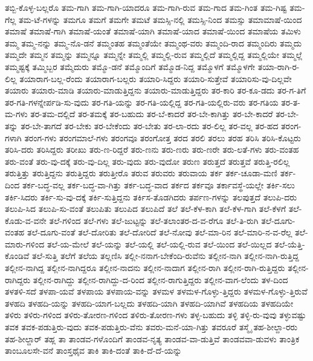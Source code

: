 {ತಬ್ಬಿ-ಕೊಳ್ಳ-ಬಲ್ಲರೊ
ತಮ-ಗಾಗಿ
ತಮ-ಗಾಗಿ-ಯಾದರೂ
ತಮ-ಗಾಗಿ-ರುವ
ತಮ-ಗಾದ
ತಮ-ಗಿಂತ
ತಮ-ಗಿಷ್ಟ
ತಮ-ಗೆಲ್ಲ
ತಮ-ಟೆ-ಗಳನ್ನು
ತಮಗೂ
ತಮಗೆ
ತಮಗೇ
ತಮಟೆ
ತಮಸ್ಸಿ-ನಲ್ಲಿ
ತಮಸ್ಸಿ-ನಿಂದ
ತಮಸ್ಸು
ತಮಾಮಾಷೆ-ಯಿಂದ
ತಮಾಷೆ
ತಮಾಷೆ-ಗಾಗಿ
ತಮಾಷೆ-ಯಂತೆ
ತಮಾಷೆ-ಯಾಗಿ
ತಮಾಷೆ-ಯಾದ
ತಮಾಷೆ-ಯಿಂದ
ತಮಾಷೆಯ
ತಮಿಳು
ತಮ್ಮ
ತಮ್ಮ-ನನ್ನು
ತಮ್ಮ-ನೊ-ಡನೆ
ತಮ್ಮಂತಹ
ತಮ್ಮಂತೆಯೇ
ತಮ್ಮಂಥ-ವರು
ತಮ್ಮಂದಿ-ರಾದ
ತಮ್ಮಂದಿರು
ತಮ್ಮದು
ತಮ್ಮದೇ
ತಮ್ಮನ
ತಮ್ಮನ್ನು
ತಮ್ಮನ್ನೂ
ತಮ್ಮನ್ನೇ
ತಮ್ಮಲ್ಲಿ
ತಮ್ಮಲ್ಲಿ-ರುವ
ತಮ್ಮಲ್ಲಿದೆ
ತಮ್ಮಲ್ಲಿದ್ದ
ತಮ್ಮಲ್ಲಿಯೇ
ತಮ್ಮಲ್ಲೆ
ತಮ್ಮಷ್ಟಕ್ಕೆ
ತಮ್ಮಿಬ್ಬರ
ತಮ್ಮೆದುರು
ತಮ್ಮೊ-ಡನೆ
ತಮ್ಮೊಂದಿಗೆ
ತಮ್ಮೊಡ-ನಿದ್ದ
ತಮ್ಮೊಳಗೆ
ತಮ್ಮೊಳಗೇ
ತಯಾ-ರಾಗಿ-ರ-ಲಿಲ್ಲ
ತಯಾರಾಗ-ಬಲ್ಲ-ರೆಂದು
ತಯಾರಾಗ-ಬಲ್ಲರು
ತಯಾರಿ-ಸಿದ್ದರು
ತಯಾರಿ-ಸುತ್ತೇವೆ
ತಯಾರಿಸು-ವು-ದಿಲ್ಲವೇ
ತಯಾರು
ತಯಾರು-ಮಾಡಿ
ತಯಾರು-ಮಾಡುತ್ತಿದ್ದನು
ತಯಾರು-ಮಾಡುತ್ತಿದ್ದರು
ತರ-ಕಾರಿ
ತರ-ಕೂ-ಡದು
ತರ-ಗ-ತಿಗೆ
ತರ-ಗತಿ-ಗಳನ್ನೇರ್ಪಡಿ-ಸು-ವುದು
ತರ-ಗತಿ-ಯನ್ನು
ತರ-ಗತಿ-ಯಲ್ಲಿದ್ದ
ತರ-ಗತಿ-ಯಲ್ಲಿರು-ವರು
ತರ-ಗತಿಯ
ತರ-ತ-ಮ-ಗಳು
ತರ-ತಮ-ದಲ್ಲಿದೆ
ತರ-ತಮಕ್ಕೆ
ತರ-ಬಹುದು
ತರ-ಬೆ-ಕಾದರೆ
ತರ-ಬೇ-ಕಾಗಿತ್ತು
ತರ-ಬೇ-ಕಾದರೆ
ತರ-ಬೇ-ತನ್ನು
ತರ-ಬೇ-ತಾಗದೆ
ತರ-ಬೇಕು
ತರ-ಬೇಕೆಂದು
ತರ-ಬೇತು
ತರ-ಲಾ-ರದು
ತರ-ಲಿಲ್ಲ
ತರ-ವಲ್ಲ
ತರ-ಹದ
ತರಂಗ-ಗಳಾಗಿ
ತರಂಗ-ಗಳು
ತರಂಗಮಾಲೆ-ಗಳು
ತರಂಗವೂ
ತರಂಗೋತ್ತ
ತರದ
ತರಲಿ
ತರಲು
ತರಹ
ತರಿಸಿ
ತರಿಸಿ-ಕೊಟ್ಟರು
ತರಿಸಿ-ದರು
ತರಿಸಿದ್ದರು
ತರೀಖು
ತರು-ಣ-ರಿದ್ದರೆ
ತರು-ಣನು
ತರು-ಣರು
ತರು-ಣರೇ
ತರು-ಲತೆ-ಗಳು
ತರು-ವಂತಹ
ತರು-ವಂತೆ
ತರು-ವು-ದಕ್ಕೆ
ತರು-ವು-ದಿಲ್ಲ
ತರು-ವುದು
ತರು-ವುದೋ
ತರುಣ
ತರುತ್ತದೆ
ತರುತ್ತವೆ
ತರುತ್ತಿ-ರಲಿಲ್ಲ
ತರುತ್ತಿತ್ತು
ತರುತ್ತಿದ್ದನು
ತರುತ್ತಿದ್ದರು
ತರುತ್ತೀರೊ
ತರುವ
ತರುವರು
ತರುವಾಯ
ತರ್ಕ
ತರ್ಕ-ಚೂಡಾ-ಮಣಿ
ತರ್ಕ-ದಿಂದ
ತರ್ಕ-ಬದ್ಧ-ವಲ್ಲ
ತರ್ಕ-ಬದ್ಧ-ವಾ-ಗಿತ್ತು
ತರ್ಕ-ಬದ್ಧ-ವಾದ
ತರ್ಕದ
ತರ್ಕವೂ
ತರ್ಕಾವಸ್ಥೆ-ಯಲ್ಲೇ
ತರ್ಕಿ-ಸಲು
ತರ್ಕಿ-ಸಿದರು
ತರ್ಕಿ-ಸು-ವು-ದಕ್ಕೆ
ತರ್ಕಿ-ಸುತ್ತಿದ್ದನು
ತರ್ಕಿಸ-ತೊಡಗಿದರು
ತರ್ಪಣ-ಗಳನ್ನು
ತಲಪುತ್ತದೆ
ತಲುಪಿ-ದರು
ತಲುಪಿ-ಸಿದ
ತಲುಪಿ-ಸು-ವಂತೆ
ತಲುಪಿತು
ತಲುಪಿದ
ತಲುಪಿದೆ
ತಲೆ
ತಲೆ-ಕೆಳ-ಕಾಗಿ
ತಲೆ-ಕೆಳ-ಗಾಗಿ
ತಲೆ-ಕೆಳಗೆ
ತಲೆ-ಕೊಡು-ವ-ವನೇ
ತಲೆ-ಗಳಿಂದ
ತಲೆ-ಗಳು
ತಲೆ-ಜುಟ್ಟನ್ನು
ತಲೆ-ತಲಾಂತರ-ದ-ವ-ರೆಗೂ
ತಲೆ-ತಿ-ರುಗಿ
ತಲೆ-ದೂಗು-ವಂತಹ
ತಲೆ-ದೂಗು-ವಂತೆ
ತಲೆ-ದೋರಿತು
ತಲೆ-ದೋರಿದೆ
ತಲೆ-ನೋವು
ತಲೆ-ಮಾ-ರಿನ
ತಲೆ-ಮಾರಿ-ನ-ವ-ರೆಲ್ಲ
ತಲೆ-ಮಾರು-ಗಳಿಂದ
ತಲೆ-ಯ-ಮೇಲೆ
ತಲೆ-ಯನ್ನು
ತಲೆ-ಯಲ್ಲಿ
ತಲೆ-ಯಲ್ಲಿ-ರುವ
ತಲೆ-ಯಿಂದ
ತಲೆ-ಯಿಲ್ಲದ
ತಲೆ-ಯೆತ್ತಿ-ಕೊಂಡಿವೆ
ತಲೆ-ಸುತ್ತಿ
ತಲೆಗೆ
ತಲೆಯ
ತಲ್ಲಣಿಸಿ
ತಲ್ಲೀ-ನನಾಗ-ಬೇಕೆಂದಿ-ರುವೆನು
ತಲ್ಲೀನ-ನಾಗಿ
ತಲ್ಲೀನ-ನಾಗಿ-ರುತ್ತಿದ್ದ
ತಲ್ಲೀನ-ನಾಗಿದ್ದ
ತಲ್ಲೀನ-ನಾಗಿದ್ದರೂ
ತಲ್ಲೀನ-ನಾದನು
ತಲ್ಲೀನ-ನಾದಾಗ
ತಲ್ಲೀನ-ರಾಗಿ
ತಲ್ಲೀನ-ರಾಗಿ-ರುತ್ತಿದ್ದರು
ತಲ್ಲೀನ-ರಾಗಿದ್ದರು
ತಲ್ಲೀನ-ರಾಗಿದ್ದು
ತಲ್ಲೀನ-ರಾಗಿದ್ದು-ದ-ರಿಂದ
ತಲ್ಲೀನ-ರಾಗುತ್ತಿದ್ದರು
ತಲ್ಲೀನ-ವಾಗ-ಲೆಂದು
ತಳ-ದಿಂದ
ತಳತಳಿ-ಸದೆ
ತಳಪಾ-ಯವೆ
ತಳಪಾಯ
ತಳಪಾಯ-ವನ್ನು
ತಳಮಳ
ತಳಮಳ-ಗೊಳ್ಳು-ತ್ತಿದ್ದರು
ತಳಮಳ-ಗೊಳ್ಳು-ತ್ತಿರುವೆ
ತಳಹದಿ
ತಳಹದಿ-ಯನ್ನು
ತಳಹದಿ-ಯಾಗ-ಬಲ್ಲದು
ತಳಹದಿ-ಯಾಗಿ
ತಳಹದಿ-ಯಾಗಿವೆ
ತಳಹದಿಯ
ತಳಹದಿಯೇ
ತಳಿರು
ತಳಿರು-ಗಳಿಂದ
ತಳಿರು-ತೋರಣ-ಗಳಿಂದ
ತಳಿರು-ತೋರಣ-ಗಳು
ತಳ್ಳ-ಬಹುದು
ತಳ್ಳಿ
ತಳ್ಳಿ-ರು-ವುವು
ತಳ್ಳುವಷ್ಟು
ತವಕ
ತವಕ-ಪಡುತ್ತಿರು-ವುದು
ತವಕ-ಪಡುತ್ತಿರು-ವೆನು
ತವರು-ಮನೆ-ಯಾ-ಗಿತ್ತು
ತವರೂರೆ
ತಸ್ಮೈ
ತಹ-ಶೀಲ್ದಾ-ರರು
ತಹ-ಶೀಲ್ದಾರ್
ತಹ್ಲ
ತಾ
ತಾಂಡವ-ಗಳೊಂದಿಗೆ
ತಾಂಡವ-ನೃತ್ಯ
ತಾಂಡವ-ವಾ-ಡುತ್ತಿವೆ
ತಾಂಡವವಾ-ಡುವಳು
ತಾಂತ್ರಿಕ
ತಾಂಬೂಲಸೇ-ವನೆ
ತಾಂಸ್ತಥೈವ
ತಾಕಿ
ತಾಕಿ-ದಂತೆ
ತಾಕಿ-ದೆ-ದೆ-ಯನ್ನು
}
